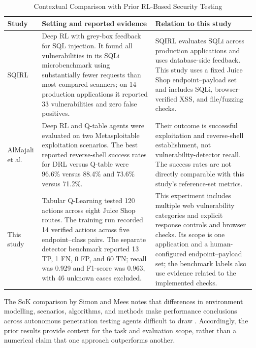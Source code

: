 \documentclass[conference]{IEEEtran}
\begin{document}
\begin{table}[!t]
\caption{Contextual Comparison with Prior RL-Based Security Testing}
\label{tab:prior-comparison}
\centering
\scriptsize
\setlength{\tabcolsep}{3pt}
\begin{tabular}{p{0.95in} p{3.15in} p{2.90in}}
\toprule
\textbf{Study} & \textbf{Setting and reported evidence} & \textbf{Relation to this study}\\
\midrule
SQIRL \cite{sqirl2023} & Deep RL with grey-box feedback for SQL injection. It found all vulnerabilities in its SQLi microbenchmark using substantially fewer requests than most compared scanners; on 14 production applications it reported 33 vulnerabilities and zero false positives. & SQIRL evaluates SQLi across production applications and uses database-side feedback. This study uses a fixed Juice Shop endpoint--payload set and includes SQLi, browser-verified XSS, and file/fuzzing checks.\\
AlMajali et al. \cite{almajali2024} & Deep RL and Q-table agents were evaluated on two Metasploitable exploitation scenarios. The best reported reverse-shell success rates for DRL versus Q-table were 96.6\% versus 88.4\% and 73.6\% versus 71.2\%. & Their outcome is successful exploitation and reverse-shell establishment, not vulnerability-detector recall. The success rates are not directly comparable with this study's reference-set metrics.\\
This study & Tabular Q-Learning tested 120 actions across eight Juice Shop routes. The training run recorded 14 verified actions across five endpoint--class pairs. The separate detector benchmark reported 13 TP, 1 FN, 0 FP, and 60 TN; recall was 0.929 and F1-score was 0.963, with 46 unknown cases excluded. & This experiment includes multiple web vulnerability categories and explicit response controls and browser checks. Its scope is one application and a human-configured endpoint--payload set; the benchmark labels also use evidence related to the implemented checks.\\
\bottomrule
\end{tabular}
\end{table}
\setlength{\tabcolsep}{6pt}

The SoK comparison by Simon and Mees notes that differences
in environment modelling, scenarios, algorithms, and methods
make performance conclusions across autonomous penetration
testing agents difficult to draw \cite{sok2024}. Accordingly,
the prior results provide context for the task and evaluation
scope, rather than a numerical claim that one approach
outperforms another.
\end{document}
